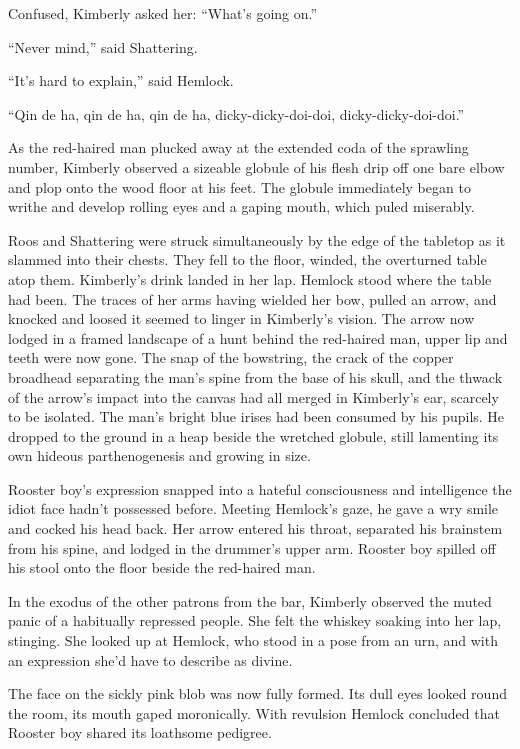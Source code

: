 \documentclass[11pt,a5paper]{article}
\begin{document}
Confused, Kimberly asked her: ``What's going on.''

``Never mind,'' said Shattering.

``It's hard to explain,'' said Hemlock.

``Qin de ha, qin de ha, qin de ha, dicky-dicky-doi-doi, dicky-dicky-doi-doi.''

As the red-haired man plucked away at the extended coda of the sprawling number, Kimberly observed a sizeable globule of his flesh drip off one bare elbow and plop onto the wood floor at his feet. The globule immediately began to writhe and develop rolling eyes and a gaping mouth, which puled miserably.

Roos and Shattering were struck simultaneously by the edge of the tabletop as it slammed into their chests. They fell to the floor, winded, the overturned table atop them. Kimberly's drink landed in her lap. Hemlock stood where the table had been. The traces of her arms having wielded her bow, pulled an arrow, and knocked and loosed it seemed to linger in Kimberly's vision. The arrow now lodged in a framed landscape of a hunt behind the red-haired man, upper lip and teeth were now gone. The snap of the bowstring, the crack of the copper broadhead separating the man's spine from the base of his skull, and the thwack of the arrow's impact into the canvas had all merged in Kimberly's ear, scarcely to be isolated. The man's bright blue irises had been consumed by his pupils. He dropped to the ground in a heap beside the wretched globule, still lamenting its own hideous parthenogenesis and growing in size.

Rooster boy's expression snapped into a hateful consciousness and intelligence the idiot face hadn't possessed before. Meeting Hemlock's gaze, he gave a wry smile and cocked his head back. Her arrow entered his throat, separated his brainstem from his spine, and lodged in the drummer's upper arm. Rooster boy spilled off his stool onto the floor beside the red-haired man.

In the exodus of the other patrons from the bar, Kimberly observed the muted panic of a habitually repressed people. She felt the whiskey soaking into her lap, stinging. She looked up at Hemlock, who stood in a pose from an urn, and with an expression she'd have to describe as divine.

The face on the sickly pink blob was now fully formed. Its dull eyes looked round the room, its mouth gaped moronically. With revulsion Hemlock concluded that Rooster boy shared its loathsome pedigree.
\end{document}
